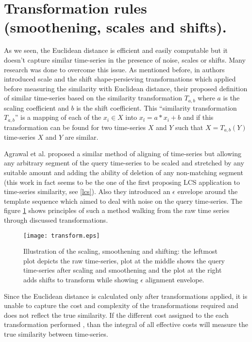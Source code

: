 \section{Transformation rules (smoothening, scales and shifts).} \label{scales_and_shifts}
As we seen, the Euclidean distance is efficient and easily computable but it doesn't capture similar time-series in the presence of noise, scales or shifts. Many research was done to overcome this issue. As mentioned before, in \cite{citeulike:3815880} authors introduced scale and the shift shape-persieving transformations which applied before measuring the similarity with Euclidean distance, their proposed definition of similar time-series based on the similarity transformation $T_{a,b}$ where $a$ is the scaling coefficient and $b$ is the shift coefficient. This ``similarity transformation $T_{a,b}$'' is a mapping of each of the $x_{i} \in X$ into $x_{i}\acute{} = a*x_{i}+b$ and if this transformation can be found for two time-series $X$ and $Y$ such that $X=T_{a,b}(Y)$ time-series $X$ and $Y$ are similar.

Agrawal et al. \cite{citeulike:3816327} proposed a similar method of aligning of time-series but allowing any arbitrary segment of the query time-series to be scaled and stretched by any suitable amount and adding the ability of deletion of any non-matching segment (this work in fact seems to be the one of the first proposing LCS application to time-series similarity, see \ref{lcs}). Also they introduced an $\epsilon$ envelope around the template sequence which aimed to deal with noise on the query time-series. The figure  \ref{fig:transform} shows principles of such a method walking from the raw time series through discussed transformations.

\begin{figure}[tbp]
   \centering
   \texttt{[image: transform.eps]}
   \caption{Illustration of the scaling, smoothening and shifting: the leftmost plot depicts the raw time-series, plot at the middle shows the query time-series after scaling and smoothening and the plot at the right adds shifts to transform while showing $\epsilon$ alignment envelope.}
   \label{fig:transform}
\end{figure} 

Since the Euclidean distance is calculated only after transformations applied, it is unable to capture the cost and complexity of the transformations required and does not reflect the true similarity. If the different cost assigned to the each transformation performed \cite{citeulike:3731711}, than the integral of all effective costs will measure the true similarity between time-series.

